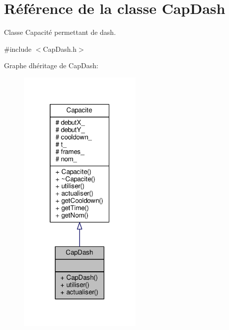 \hypertarget{class_cap_dash}{}\section{Référence de la classe Cap\+Dash}
\label{class_cap_dash}


Classe Capacité permettant de dash.  




{\ttfamily \#include $<$Cap\+Dash.\+h$>$}



Graphe d\textquotesingle{}héritage de Cap\+Dash\+:\nopagebreak
\begin{figure}[H]
\begin{center}
\leavevmode
\includegraphics[width=169pt]{class_cap_dash__inherit__graph}
\end{center}
\end{figure}


